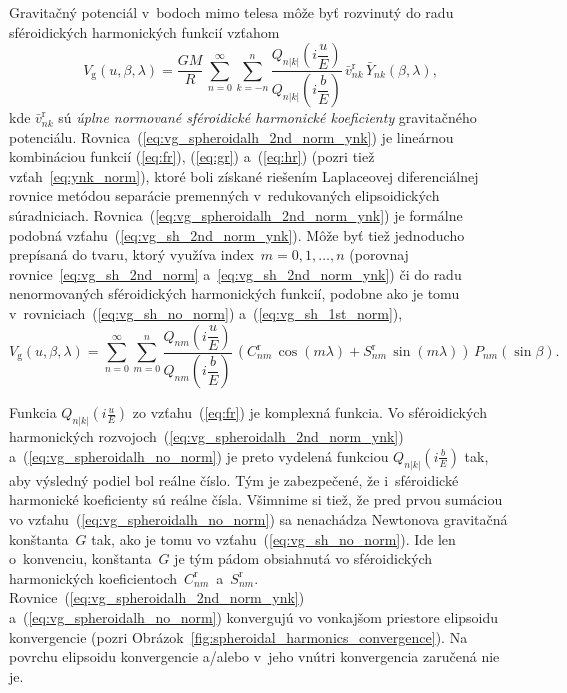 \documentclass[a4paper, 12pt]{book}
\newcommand{\gidx}{\mathrm g}
\begin{document}
Gravitačný potenciál v~bodoch mimo telesa môže byť rozvinutý do radu 
sféroidických harmonických funkcií vzťahom \parencite{MoritzPhysicalGeodesy}
%
\begin{equation}
\label{eq:vg_spheroidalh_2nd_norm_ynk}
V_\gidx(u, \beta, \lambda) = \frac{GM}{R} \, \sum_{n = 0}^\infty \sum_{k 
= -n}^n \frac{Q_{n|k|}\left( i \dfrac{u}{E} \right)}{Q_{n|k|}\left( 
i \dfrac{b}{E} \right)} \, \bar{v}^{\mathrm{r}}_{nk} \, \bar{Y}_{nk}(\beta, 
\lambda){,}
\end{equation}
%
kde $\bar{v}_{nk}^\mathrm{r}$ sú \emph{úplne normované sféroidické harmonické 
koeficienty} gravitačného potenciálu.  
Rovnica~(\ref{eq:vg_spheroidalh_2nd_norm_ynk}) je lineárnou kombináciou funkcií 
(\ref{eq:fr}), (\ref{eq:gr}) a~(\ref{eq:hr}) (pozri tiež 
vzťah~\ref{eq:ynk_norm}), ktoré boli získané riešením Laplaceovej 
diferenciálnej rovnice metódou separácie premenných v~redukovaných 
elipsoidických súradniciach.  Rovnica~(\ref{eq:vg_spheroidalh_2nd_norm_ynk}) je 
formálne podobná vzťahu~(\ref{eq:vg_sh_2nd_norm_ynk}).  Môže byť tiež 
jednoducho prepísaná do tvaru, ktorý využíva index~$m = 0, 1, \dots, n$ 
(porovnaj rovnice~\ref{eq:vg_sh_2nd_norm} a~\ref{eq:vg_sh_2nd_norm_ynk}) či do 
radu nenormovaných sféroidických harmonických funkcií, podobne ako je tomu 
v~rovniciach~(\ref{eq:vg_sh_no_norm}) a~(\ref{eq:vg_sh_1st_norm}),
%
\begin{equation}
\label{eq:vg_spheroidalh_no_norm}
V_\gidx(u, \beta, \lambda) = \sum_{n = 0}^\infty \sum_{m = 0}^n 
\frac{Q_{nm}\left( i \dfrac{u}{E} \right)}{Q_{nm}\left( i \dfrac{b}{E} \right)} 
\, \left( C^{\mathrm{r}}_{nm} \, \cos(m\lambda) + S^{\mathrm{r}}_{nm} \, 
\sin(m\lambda) \right) \, P_{nm}(\sin\beta){.}
\end{equation}

Funkcia $Q_{n|k|}\left( i \frac{u}{E} \right)$ zo vzťahu~(\ref{eq:fr}) je 
komplexná funkcia.  Vo sféroidických harmonických 
rozvojoch~(\ref{eq:vg_spheroidalh_2nd_norm_ynk}) 
a~(\ref{eq:vg_spheroidalh_no_norm}) je preto vydelená funkciou $Q_{n|k|}\left( 
i \frac{b}{E} \right)$ tak, aby výsledný podiel bol reálne číslo.  Tým je 
zabezpečené, že i~sféroidické harmonické koeficienty sú reálne čísla.  Všimnime 
si tiež, že pred prvou sumáciou vo vzťahu~(\ref{eq:vg_spheroidalh_no_norm}) sa 
nenachádza Newtonova gravitačná konštanta~$G$ tak, ako je tomu vo 
vzťahu~(\ref{eq:vg_sh_no_norm}).  Ide len o~konvenciu, konštanta~$G$ je tým 
pádom obsiahnutá vo sféroidických harmonických 
koeficientoch~$C_{nm}^\mathrm{r}$~a~$S_{nm}^\mathrm{r}$.  
Rovnice~(\ref{eq:vg_spheroidalh_2nd_norm_ynk}) 
a~(\ref{eq:vg_spheroidalh_no_norm}) konvergujú vo vonkajšom priestore elipsoidu 
konvergencie (pozri Obrázok~\ref{fig:spheroidal_harmonics_convergence}).  Na 
povrchu elipsoidu konvergencie a/alebo v~jeho vnútri konvergencia zaručená nie 
je.
\end{document}

